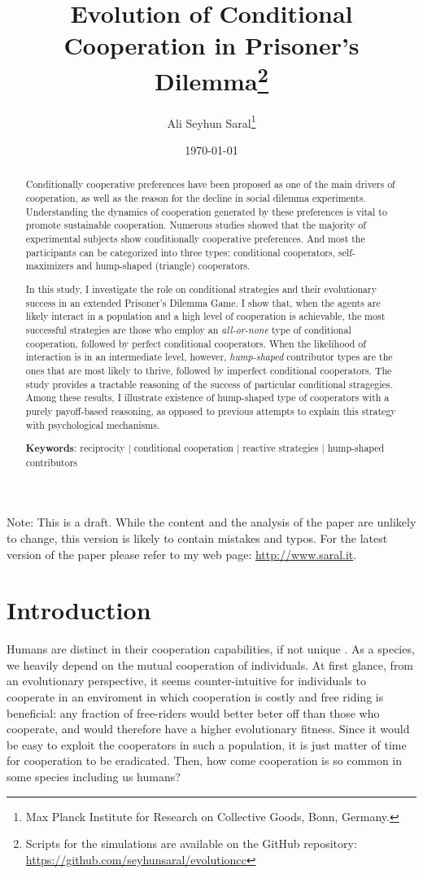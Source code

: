 \documentclass[12pt]{article}
\title{Evolution of Conditional Cooperation in Prisoner's Dilemma\footnote{Scripts for the simulations are available on the GitHub repository: \url{https://github.com/seyhunsaral/evolutioncc}}}
\author{Ali Seyhun Saral\thanks{Max Planck Institute for Research on Collective Goods, Bonn, Germany.}}
\date{\today}
\begin{document}
\onehalfspacing
\sloppy
\maketitle   
Note: This is a draft. While the content and the analysis of the paper are unlikely to change, this version is likely to contain mistakes and typos. For the latest version of the paper please refer to my web page: \url{http://www.saral.it}.
\begin{abstract}

\thispagestyle{plain}
Conditionally cooperative preferences have been proposed as one of the main drivers of cooperation, as well as the reason for the decline in social dilemma experiments. Understanding the dynamics of cooperation generated by these preferences is vital to promote sustainable cooperation. Numerous studies showed that the majority of experimental subjects show conditionally cooperative preferences. And most the participants can be categorized into three types: conditional cooperators, self-maximizers and hump-shaped (triangle) cooperators. 

In this study, I investigate the role on conditional strategies and their evolutionary success in an extended Prisoner's Dilemma Game. I show that, when the agents are likely interact in a population and a high level of cooperation is achievable, the most successful strategies are those who employ an \textit{all-or-none} type of conditional cooperation, followed by perfect conditional cooperators. When the likelihood of interaction is in an intermediate level, however, \textit{hump-shaped} contributor types are the ones that are most likely to thrive, followed by imperfect conditional cooperators. The study provides a tractable reasoning of the success of particular conditional stragegies. Among these results, I illustrate existence of hump-shaped type of cooperators with a purely payoff-based reasoning, as opposed to previous attempts to explain this strategy with psychological mechanisms. 

\textbf{Keywords}: reciprocity | conditional cooperation | reactive strategies | hump-shaped contributors 
\end{abstract}

\section*{Introduction} 
Humans are distinct in their cooperation capabilities, if not unique \citep[See][]{Bowles2011,Wilson2012}. As a species, we heavily depend on the mutual cooperation of individuals. At first glance, from an evolutionary perspective, it seems counter-intuitive for individuals to cooperate in an enviroment in which cooperation is costly and free riding is beneficial: any fraction of free-riders would better beter off than those who cooperate, and would therefore have a higher evolutionary fitness. Since it would be easy to exploit the cooperators in such a population, it is just matter of time for cooperation to be eradicated. Then, how come cooperation is so common in some species including us humans?
\end{document}
